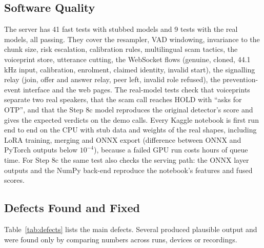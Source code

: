 \documentclass[10pt,a4paper,twocolumn]{article}
\begin{document}
\subsection{Software Quality}
\label{sec:tests}
The server has 41 fast tests with stubbed models and 9 tests with the real models, all passing. They cover the resampler, VAD windowing, invariance to the chunk size, risk escalation, calibration rules, multilingual scam tactics, the voiceprint store, utterance cutting, the WebSocket flows (genuine, cloned, 44.1\,kHz input, calibration, enrolment, claimed identity, invalid start), the signalling relay (join, offer and answer relay, peer left, invalid role refused), the prevention-event interface and the web pages. The real-model tests check that voiceprints separate two real speakers, that the scam call reaches HOLD with ``asks for OTP'', and that the Step 8c model reproduces the original detector's score and gives the expected verdicts on the demo calls. Every Kaggle notebook is first run end to end on the CPU with stub data and weights of the real shapes, including LoRA training, merging and ONNX export (difference between ONNX and PyTorch outputs below $10^{-4}$), because a failed GPU run costs hours of queue time. For Step 8c the same test also checks the serving path: the ONNX layer outputs and the NumPy back-end reproduce the notebook's features and fused scores.

\subsection{Defects Found and Fixed}
Table~\ref{tab:defects} lists the main defects. Several produced plausible output and were found only by comparing numbers across runs, devices or recordings.
\end{document}
